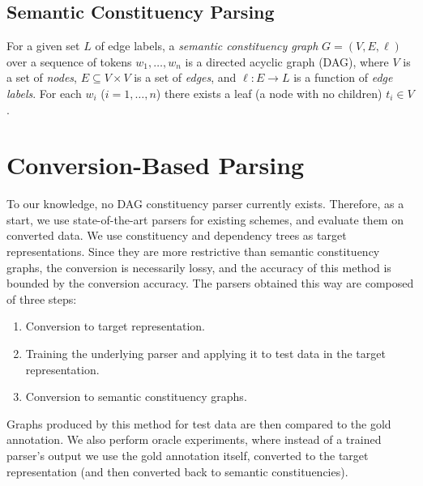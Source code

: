 \documentclass[11pt]{article}
\begin{document}




\subsection{Semantic Constituency Parsing}

For a given set $L$ of edge labels, a \textit{semantic constituency graph} $G=(V,E, \ell)$ over a sequence of tokens $w_1, \ldots, w_n$ is a directed acyclic graph (DAG), where $V$ is a set of \textit{nodes}, $E \subseteq V\times V$ is a set of \textit{edges}, and $\ell:E\to L$ is a function of \textit{edge labels}. For each $w_i$ ($i=1, \ldots, n$) there exists a leaf (a node with no children) $t_i \in V$.


\section{Conversion-Based Parsing}\label{sec:conversion_approach}

To our knowledge, no DAG constituency parser currently exists. Therefore, as a start, we use state-of-the-art parsers for existing schemes, and evaluate them on converted data. We use constituency and dependency trees as target representations. Since they are more restrictive than semantic constituency graphs, the conversion is necessarily lossy, and the accuracy of this method is bounded by the conversion accuracy.
The parsers obtained this way are composed of three steps:
\begin{enumerate}
\item Conversion to target representation.
\item Training the underlying parser and applying it to test data in the target representation.
\item Conversion to semantic constituency graphs.
\end{enumerate}
Graphs produced by this method for test data are then compared to the gold annotation.
We also perform oracle experiments, where instead of a trained parser's output we use the gold annotation itself, converted to the target representation (and then converted back to semantic constituencies).
\end{document}
